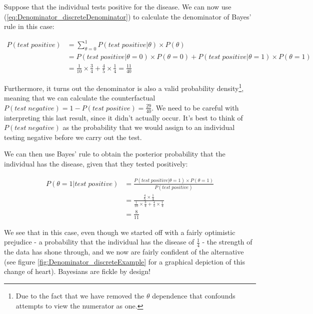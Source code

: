 \documentclass[11pt,fullpage]{book}
\begin{document}
Suppose that the individual tests positive for the disease. We can now use (\ref{eq:Denominator_discreteDenominator}) to calculate the denominator of Bayes' rule in this case:

\begin{equation}
\begin{align}
P(test\; positive) &= \sum\limits_{\theta=0}^{1} P(test\; positive|\theta) \times P(\theta)\\
&= P(test\; positive|\theta=0) \times P(\theta=0) + P(test\; positive|\theta=1) \times P(\theta=1)\\
&= \frac{1}{10} \times \frac{3}{4} + \frac{4}{5} \times \frac{1}{4} = \frac{11}{40}
\end{align}
\end{equation}

Furthermore, it turns out the denominator is also a valid probability density\footnote{Due to the fact that we have removed the $\theta$ dependence that confounds attempts to view the numerator as one.}, meaning that we can calculate the counterfactual $P(test\; negative) = 1 - P(test\; positive) = \frac{29}{40}$. We need to be careful with interpreting this last result, since it didn't actually occur. It's best to think of $P(test\; negative)$ as the probability that we would assign to an individual testing negative before we carry out the test.

We can then use Bayes' rule to obtain the posterior probability that the individual has the disease, given that they tested positively:

\begin{equation}\label{eq:Denominator_discreteExamplePosterior}
\begin{align}
P(\theta=1|test\; positive) &= \frac{P(test\; positive|\theta=1)\times P(\theta=1)}{P(test\; positive)}\\
&= \frac{\frac{4}{5} \times \frac{1}{4}}{\frac{1}{10} \times \frac{3}{4} + \frac{4}{5} \times \frac{1}{4}}\\
&= \frac{8}{11}
\end{align}
\end{equation}

We see that in this case, even though we started off with a fairly optimistic prejudice - a probability that the individual has the disease of $\frac{1}{4}$ - the strength of the data has shone through, and we now are fairly confident of the alternative (see figure \ref{fig:Denominator_discreteExample} for a graphical depiction of this change of heart). Bayesians are fickle by design!
\end{document}

